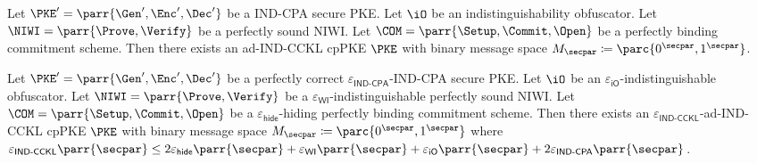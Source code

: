 \begin{theorem}[Informal]
    Let \(\PKE' = \parr{\Gen',\Enc',\Dec'}\) be a IND-CPA secure PKE.
    Let \(\iO\) be an indistinguishability obfuscator.
    Let \(\NIWI = \parr{\Prove,\Verify}\) be a perfectly sound NIWI.
    Let \(\COM = \parr{\Setup,\Commit,\Open}\) be a perfectly binding commitment scheme.
    Then there exists an ad-IND-CCKL cpPKE \(\PKE\) with binary message space \(M_\secpar \coloneq \parc{0^\secpar,1^\secpar}\).
\end{theorem}

\begin{theorem}
    Let \(\PKE' = \parr{\Gen',\Enc',\Dec'}\) be a perfectly correct \(\varepsilon_{\textsf{IND-CPA}}\)-IND-CPA secure PKE.
    Let \(\iO\) be an \(\varepsilon_{\textsf{iO}}\)-indistinguishable obfuscator.
    Let \(\NIWI = \parr{\Prove,\Verify}\) be a \(\varepsilon_{\textsf{WI}}\)-indistinguishable perfectly sound NIWI.
    Let \(\COM = \parr{\Setup,\Commit,\Open}\) be a \(\varepsilon_{\textsf{hide}}\)-hiding perfectly binding commitment scheme.
    Then there exists an \(\varepsilon_{\textsf{IND-CCKL}}\)-ad-IND-CCKL cpPKE \(\PKE\) with binary message space \(M_\secpar \coloneq \parc{0^\secpar,1^\secpar}\) where \(\varepsilon_{\textsf{IND-CCKL}}\parr{\secpar} \leq 2\varepsilon_{\textsf{hide}}\parr{\secpar} + \varepsilon_{\textsf{WI}}\parr{\secpar} + \varepsilon_{\textsf{iO}}\parr{\secpar} + 2\varepsilon_{\textsf{IND-CPA}}\parr{\secpar}\).
\end{theorem}


